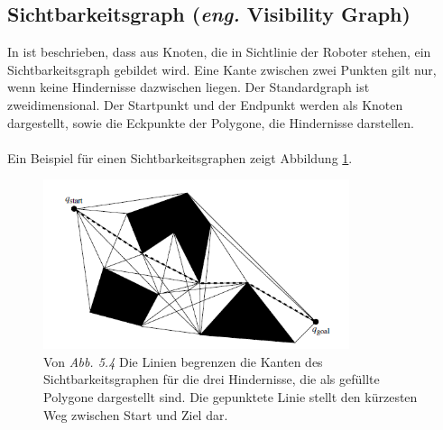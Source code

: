\subsection{Sichtbarkeitsgraph (\textit{eng.} Visibility Graph)}
%
%
In \cite{Principles:05} ist beschrieben, dass aus Knoten, die in Sichtlinie der Roboter stehen, ein Sichtbarkeitsgraph gebildet wird. Eine Kante zwischen zwei Punkten gilt nur, wenn keine Hindernisse dazwischen liegen. Der Standardgraph ist zweidimensional. Der Startpunkt und der Endpunkt werden als Knoten dargestellt, sowie die Eckpunkte der Polygone, die Hindernisse darstellen.
\\\\
Ein Beispiel für einen Sichtbarkeitsgraphen zeigt Abbildung \ref{sec3a}.
\begin{figure} %
	\centering
	\includegraphics[width=0.8\textwidth]{images/Robot_Motion_Visibility_Graph.png}
	\caption{Von \cite[~S. 111]{Principles:05} \textit{Abb. 5.4} Die Linien begrenzen die Kanten des Sichtbarkeitsgraphen für die drei Hindernisse, die als gefüllte Polygone dargestellt sind. Die gepunktete Linie stellt den kürzesten Weg zwischen Start und Ziel dar.}
	\label{sec3a}
\end{figure}


